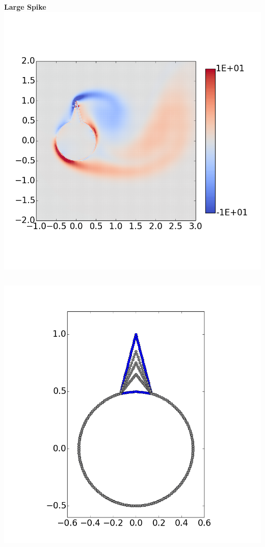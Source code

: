 \documentclass[9pt]{beamer}
\begin{document}
\begin{frame}
\begin{columns}[c]
   \centering
    \textbf{Large Spike} \\
    \includegraphics[width=1\textwidth]{PerturbBigHorn}
\end{columns}

\begin{columns}[c]
   \centering
{}
   \centering
    \includegraphics[width=1\textwidth]{CylinderPerturbations}
   \centering
\end{columns}
\end{frame}
\end{document}
